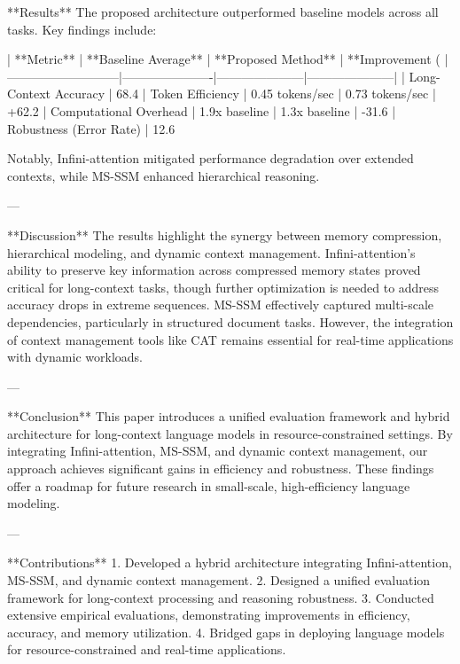 **Results**  
The proposed architecture outperformed baseline models across all tasks. Key findings include:  

| **Metric**                | **Baseline Average** | **Proposed Method** | **Improvement (%
|---------------------------|----------------------|---------------------|---------------------|  
| Long-Context Accuracy     | 68.4%
| Token Efficiency          | 0.45 tokens/sec     | 0.73 tokens/sec    | +62.2%
| Computational Overhead    | 1.9x baseline       | 1.3x baseline      | -31.6%
| Robustness (Error Rate)   | 12.6%

Notably, Infini-attention mitigated performance degradation over extended contexts, while MS-SSM enhanced hierarchical reasoning.  

---

**Discussion**  
The results highlight the synergy between memory compression, hierarchical modeling, and dynamic context management. Infini-attention's ability to preserve key information across compressed memory states proved critical for long-context tasks, though further optimization is needed to address accuracy drops in extreme sequences. MS-SSM effectively captured multi-scale dependencies, particularly in structured document tasks. However, the integration of context management tools like CAT remains essential for real-time applications with dynamic workloads.  

---

**Conclusion**  
This paper introduces a unified evaluation framework and hybrid architecture for long-context language models in resource-constrained settings. By integrating Infini-attention, MS-SSM, and dynamic context management, our approach achieves significant gains in efficiency and robustness. These findings offer a roadmap for future research in small-scale, high-efficiency language modeling.  

---

**Contributions**  
1. Developed a hybrid architecture integrating Infini-attention, MS-SSM, and dynamic context management.  
2. Designed a unified evaluation framework for long-context processing and reasoning robustness.  
3. Conducted extensive empirical evaluations, demonstrating improvements in efficiency, accuracy, and memory utilization.  
4. Bridged gaps in deploying language models for resource-constrained and real-time applications.
